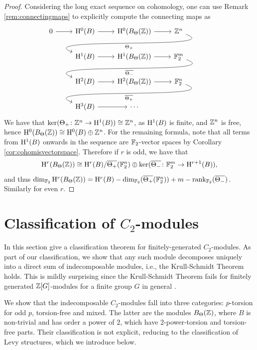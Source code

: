 \begin{proof}
  Considering the long exact sequence on cohomology, one can use Remark \ref{rem:connectingmaps} to explicitly compute the connecting maps as 
  \[
  \begin{tikzcd}
  0 \rar & \HH^0(B) \rar & \HH^0(B_{\Theta}(\bZ)) \rar & \bZ^n \ar[out=-20, in=160, "\Theta_+"]{dll} \\
  & \HH^1(B) \rar & \HH^1(B_{\Theta}(\bZ)) \rar & \bF_2^m \ar[out=-20, in=160, "\overline{\Theta_-}"]{dll} \\
  & \HH^2(B) \rar & \HH^2(B_{\Theta}(\bZ)) \rar & \bF_2^n \ar[out=-20, in=160, "\overline{\Theta_+}"]{dll}\\
  & \HH^3(B) \rar & \cdots
\end{tikzcd}
\]
We have that $\ker(\Theta_+ \colon {\mathbb Z}^n \rightarrow \mathrm{H}^1(B)) \cong {\mathbb Z}^n$, as $\mathrm{H}^1(B)$ is finite, and ${\mathbb Z}^n$ is free, hence $\mathrm{H}^{0}(B_\Theta ({\mathbb Z})) \cong \mathrm{H}^0 (B) \oplus {\mathbb Z}^n$. For the remaining formula, note that all terms from $\mathrm{H}^1(B)$ onwards in the sequence are ${\mathbb F}_2$-vector spaces by Corollary \ref{cor:cohomisvectorspace}. Therefore if $r$ is odd, we have that 
\[
\mathrm{H}^r(B_{\Theta}({\mathbb Z})) \cong \mathrm{H}^r(B) / \overline{\Theta_+}({\mathbb F}_2^n) \oplus \ker(\overline{\Theta_-} \colon {\mathbb F}_2^m \rightarrow \mathrm{H}^{r+1}(B)),
\]
and thus $\dim_{{\mathbb F}_2} \mathrm{H}^r (B_\Theta ({\mathbb Z})) = \mathrm{H}^r(B) - \dim_{{\mathbb F}_2}(\overline{\Theta_+}({\mathbb F}_2^n)) + m - \rank_{{\mathbb F}_2}(\overline{\Theta_-})$. Similarly for even $r$.
\end{proof}

\section{Classification of $C_2$-modules}
In this section give a classification theorem for finitely-generated $C_2$-modules.
As part of our classification, we show that any such module decomposes uniquely into a direct sum of indecomposable modules, i.e., the Krull-Schmidt Theorem holds.
This is mildly surprising since the Krull-Schmidt Theorem fails for finitely generated ${\mathbb Z} [G]$-modules for a finite group $G$ in general \cite{ReinerKS}.

We show that the indecomposable $C_2$-modules fall into three categories: $p$-torsion for odd $p$, torsion-free and mixed.
The latter are the modules $B_\Theta ({\mathbb Z})$, where $B$ is non-trivial and has order a power of $2$, which have 2-power-torsion and torsion-free parts.
Their classification is not explicit, reducing to the classification of Levy structures, which we introduce below.

